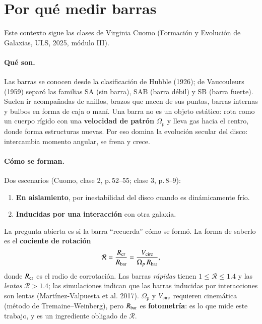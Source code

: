\documentclass[11pt,a4paper]{article}
\begin{document}
\section{Por qué medir barras}\label{sec:contexto}

Este contexto sigue las clases de Virginia Cuomo (Formación y Evolución de Galaxias, ULS, 2025, módulo III).

\paragraph{Qué son.} Las barras se conocen desde la clasificación de Hubble (1926); de Vaucouleurs (1959) separó
las familias SA (sin barra), SAB (barra débil) y SB (barra fuerte). Suelen ir acompañadas de anillos, brazos que
nacen de sus puntas, barras internas y bulbos en forma de caja o maní. Una barra no es un objeto estático: rota
como un cuerpo rígido con una \textbf{velocidad de patrón} $\Omega_p$ y lleva gas hacia el centro, donde forma
estructuras nuevas. Por eso domina la evolución secular del disco: intercambia momento angular, se frena y crece.

\paragraph{Cómo se forman.} Dos escenarios (Cuomo, clase 2, p.\,52--55; clase 3, p.\,8--9):
\begin{enumerate}
\item \textbf{En aislamiento}, por inestabilidad del disco cuando es dinámicamente frío.
\item \textbf{Inducidas por una interacción} con otra galaxia.
\end{enumerate}
La pregunta abierta es si la barra ``recuerda'' cómo se formó. La forma de saberlo es el \textbf{cociente de
rotación}
\begin{equation}\label{eq:R}
\mathcal{R} = \frac{R_{\rm cr}}{R_{\rm bar}} = \frac{V_{\rm circ}}{\Omega_p\,R_{\rm bar}},
\end{equation}
donde $R_{\rm cr}$ es el radio de corrotación. Las barras \emph{rápidas} tienen $1 \le \mathcal{R} \le 1.4$ y las
\emph{lentas} $\mathcal{R} > 1.4$; las simulaciones indican que las barras inducidas por interacciones son lentas
(Martínez-Valpuesta et al. 2017). $\Omega_p$ y $V_{\rm circ}$ requieren cinemática (método de Tremaine--Weinberg),
pero $R_{\rm bar}$ es \textbf{fotometría}: es lo que mide este trabajo, y es un ingrediente obligado de
$\mathcal{R}$.
\end{document}
